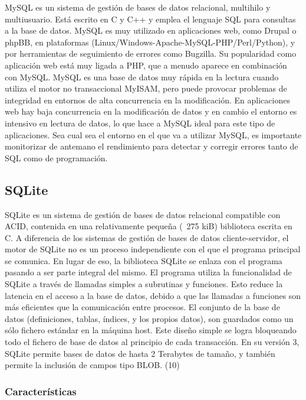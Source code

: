 MySQL es un sistema de gestión de bases de datos relacional, multihilo y multiusuario. Está escrito en C y C++ y emplea el lenguaje SQL para consultas a la base de datos.
MySQL es muy utilizado en aplicaciones web, como Drupal o phpBB, en plataformas (Linux/Windows-Apache-MySQL-PHP/Perl/Python), y por herramientas de seguimiento de errores como Bugzilla. Su popularidad como aplicación web está muy ligada a PHP, que a menudo aparece en combinación con MySQL.
MySQL es una base de datos muy rápida en la lectura cuando utiliza el motor no transaccional MyISAM, pero puede provocar problemas de integridad en entornos de alta concurrencia en la modificación. En aplicaciones web hay baja concurrencia en la modificación de datos y en cambio el entorno es intensivo en lectura de datos, lo que hace a MySQL ideal para este tipo de aplicaciones. Sea cual sea el entorno en el que va a utilizar MySQL, es importante monitorizar de antemano el rendimiento para detectar y corregir errores tanto de SQL como de programación.



\subsection{SQLite} %
\label{sub:sqlite}


SQLite es un sistema de gestión de bases de datos relacional compatible con ACID, contenida en una relativamente pequeña (~275 kiB) biblioteca escrita en C. 
A diferencia de los sistemas de gestión de bases de datos cliente-servidor, el motor de SQLite no es un proceso independiente con el que el programa principal se comunica. En lugar de eso, la biblioteca SQLite se enlaza con el programa pasando a ser parte integral del mismo. El programa utiliza la funcionalidad de SQLite a través de llamadas simples a subrutinas y funciones. Esto reduce la latencia en el acceso a la base de datos, debido a que las llamadas a funciones son más eficientes que la comunicación entre procesos. El conjunto de la base de datos (definiciones, tablas, índices, y los propios datos), son guardados como un sólo fichero estándar en la máquina host. Este diseño simple se logra bloqueando todo el fichero de base de datos al principio de cada transacción.
En su versión 3, SQLite permite bases de datos de hasta 2 Terabytes de tamaño, y también permite la inclusión de campos tipo BLOB. (10)

\subsubsection{Características} %
\label{ssub:caracteristicas}

